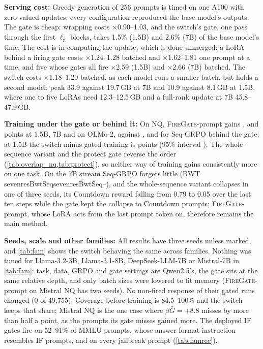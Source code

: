 \documentclass{article}
\theoremstyle{plain}
\theoremstyle{definition}
\theoremstyle{remark}
\renewcommand{\lg}{\ell_{\mathrm{g}}}
\newcommand{\methodp}{\textsc{FireGate}-prompt}
\newcommand{\sev}[1]{\ifcsname seven#1\endcsname\csname seven#1\endcsname\else--\fi}
\begin{document}
\textbf{Serving cost:} Greedy generation of 256 prompts is timed on one A100 with zero-valued updates; every
configuration reproduced the base model's outputs. The gate is cheap: wrapping costs $\times$0.90--1.03, and the
switch's gate, one pass through the first $\lg$ blocks, takes 1.5\% (1.5B) and 2.6\% (7B) of the base model's time.
The cost is in computing the update, which is done unmerged: a LoRA behind a firing gate costs $\times$1.24--1.28
batched and $\times$1.62--1.81 one prompt at a time, and five whose gates all fire $\times$2.59 (1.5B) and $\times$2.66
(7B) batched. The switch costs $\times$1.18--1.20 batched, as each model runs a smaller batch, but holds a second model:
peak 33.9 against 19.7\,GB at 7B and 10.9 against 8.1\,GB at 1.5B, where one to five LoRAs need 12.3--12.5\,GB and a
full-rank update at 7B 45.8--47.9\,GB.

\textbf{Training under the gate or behind it:} On NQ, \methodp{} gains \ovlTwpAGain{}, \ovlSevenTwpAGain{} and
\ovlOlmoTwpAGain{} points at 1.5B, 7B and on OLMo-2, against \ovwNqSeqRatioAGain, \ovwNqsevenSeqRatioAGain{} and
\ovwNqolmoSeqRatioAGain{} for Seq-GRPO behind the gate; at 1.5B the switch minus gated training is
\rvNqDiffSeqswVsTwp{} points (95\% interval \rvNqDiffSeqswVsTwpCi). The whole-sequence variant and the protect gate
reverse the order (\cref{tab:overlap_nq,tab:protect}), so neither way of training gains consistently more on one
task. On the 7B stream Seq-GRPO forgets little (BWT \sev{resBwtSeq}), and the whole-sequence variant collapses in one
of three seeds, its Countdown reward falling from 0.79 to 0.05 over the last ten steps while the gate kept the
collapse to Countdown prompts; \methodp{}, whose LoRA acts from the last prompt token on, therefore remains the
main method.

\textbf{Seeds, scale and other families:} All results have three seeds unless marked, and
\cref{tab:fam} shows the switch behaving the same across families. Nothing was tuned for Llama-3.2-3B,
Llama-3.1-8B, DeepSeek-LLM-7B or Mistral-7B in \cref{tab:fam}: task, data, GRPO and gate settings are Qwen2.5's, the
gate sits at the same relative depth, and only batch sizes were lowered to fit memory (\methodp{} on Mistral NQ has two
seeds). No non-fired response of their gated runs changed (0 of 49{,}755). Coverage before training is 84.5--100\%
and the switch keeps that share; Mistral NQ is the one case where $\beta\bar G=+8.8$ misses by more than half a point,
as the prompts its gate misses gained more. The deployed IF gates fire on 52--91\% of MMLU prompts, whose
answer-format instruction resembles IF prompts, and on every jailbreak prompt (\cref{tab:famrec}).
\end{document}
